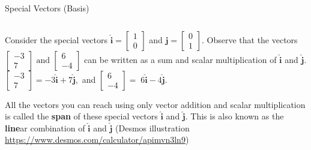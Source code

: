 \documentclass[10pt, aspectratio=169]{beamer}
\begin{document}
\begin{frame}{Special Vectors (Basis)}
\begin{columns}
    \begin{column}{0.6\textwidth}
        Consider the special vectors 
        \(\mathbf{\hat{i}} = \begin{bmatrix}
                1\\0
            \end{bmatrix}\)
        and 
        \(\mathbf{\hat{j}} = \begin{bmatrix}
                0\\1
            \end{bmatrix}\).
        Observe that the vectors 
        \(\begin{bmatrix}
                -3\\7
            \end{bmatrix}
            \text{ and }
            \begin{bmatrix}
                6\\
                -4
            \end{bmatrix}
        \)
        can be written as a sum and scalar multiplication of \(\mathbf{\hat{i}}\) and \(\mathbf{\hat{j}}\).
        \(
            \begin{bmatrix}
                -3\\7
            \end{bmatrix}
            = -3\mathbf{\hat{i}} + 7\mathbf{\hat{j}},
        \) 
        and
        \(
            \begin{bmatrix}
                6\\
                -4
            \end{bmatrix}
            = \; 6\mathbf{\hat{i}} - 4\mathbf{\hat{j}}
        \).
        
        \vspace{0.2cm}
        
        All the vectors you can reach using only vector addition and scalar multiplication is called the \textbf{span} of these special vectors \(\mathbf{\hat{i}}\) and \(\mathbf{\hat{j}}\).
        This is also known as the \textbf{line}ar combination of  \(\mathbf{\hat{i}}\) and \(\mathbf{\hat{j}}\) (Desmos illustration \url{https://www.desmos.com/calculator/apimvn3ln9})
    \end{column}
    

\end{columns}
\end{frame}
\end{document}
